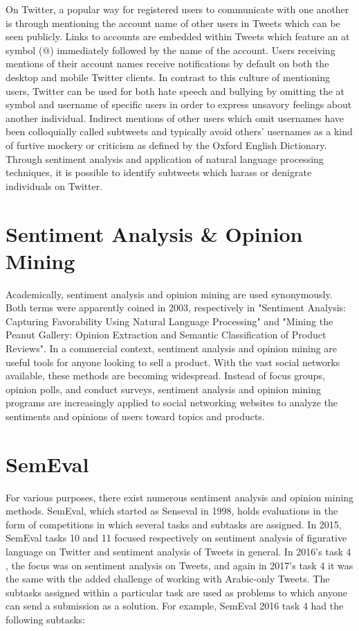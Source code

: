 \documentclass[11pt, twoside, reqno]{book}
\begin{document}
On Twitter, a popular way for registered users to communicate with one another is through mentioning the account name of other users in Tweets which can be seen publicly. Links to accounts are embedded within Tweets which feature an at symbol (@) immediately followed by the name of the account. Users receiving mentions of their account names receive notifications by default on both the desktop and mobile Twitter clients. In contrast to this culture of mentioning users, Twitter can be used for both hate speech and bullying by omitting the at symbol and username of specific users in order to express unsavory feelings about another individual. Indirect mentions of other users which omit usernames have been colloquially called subtweets and typically avoid others' usernames as a kind of furtive mockery or criticism as defined by the Oxford English Dictionary. Through sentiment analysis and application of natural language processing techniques, it is possible to identify subtweets which harass or denigrate individuals on Twitter. 

\section{Sentiment Analysis \& Opinion Mining}
\label{secI2}

Academically, sentiment analysis and opinion mining are used synonymously. Both terms were apparently coined in 2003, respectively in "Sentiment Analysis: Capturing Favorability Using Natural Language Processing"\cite{SENTIMENTORIGIN} and "Mining the Peanut Gallery: Opinion Extraction and Semantic Classification of Product Reviews"\cite{OPINIONORIGIN}. In a commercial context, sentiment analysis and opinion mining are useful tools for anyone looking to sell a product. With the vast social networks available, these methods are becoming widespread. Instead of focus groups, opinion polls, and conduct surveys, sentiment analysis and opinion mining programs are increasingly applied to social networking websites to analyze the sentiments and opinions of users toward topics and products. 

\section{SemEval}
\label{secI3}

For various purposes, there exist numerous sentiment analysis and opinion mining methods. SemEval, which started as Senseval in 1998, holds evaluations in the form of competitions in which several tasks and subtasks are assigned. In 2015, SemEval tasks 10 \cite{SEMEVAL201510} and 11 \cite{SEMEVAL201511} focused respectively on sentiment analysis of figurative language on Twitter and sentiment analysis of Tweets in general. In 2016's task 4 \cite{SEMEVAL20164}, the focus was on sentiment analysis on Tweets, and again in 2017's task 4 \cite{SEMEVAL20174} it was the same with the added challenge of working with Arabic-only Tweets. The subtasks assigned within a particular task are used as problems to which anyone can send a submission as a solution. For example, SemEval 2016 task 4 had the following subtasks: 
\end{document}
